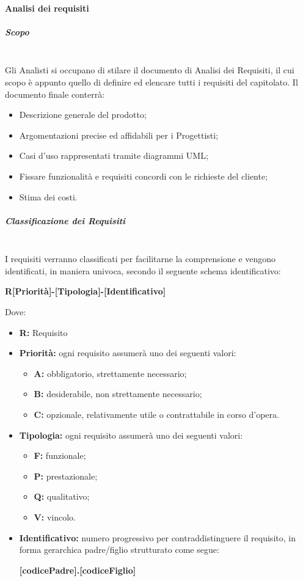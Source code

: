 			\paragraph{Analisi dei requisiti}
				\subparagraph{Scopo \\  \\}
					Gli Analisti si occupano di stilare il documento di Analisi dei Requisiti, il cui scopo è appunto quello di definire ed elencare tutti i requisiti del capitolato. Il documento finale conterrà:
					\begin{itemize}
						\item Descrizione generale del prodotto;
						\item Argomentazioni precise ed affidabili per i Progettisti;
						\item Casi d'uso rappresentati tramite diagrammi UML;
						\item Fissare funzionalità e requisiti concordi con le richieste del cliente;
						\item Stima dei costi.
					\end{itemize}
				\subparagraph{Classificazione dei Requisiti \\ \\}
					I requisiti verranno classificati per facilitarne la comprensione e vengono identificati, in maniera univoca, secondo il seguente schema identificativo:
					\begin{center}
						\textbf{R[Priorità]-[Tipologia]-[Identificativo]}
					\end{center}
					Dove:
					\begin{itemize}
						\item \textbf{R:} Requisito 
						\item \textbf{Priorità:} ogni requisito assumerà uno dei seguenti valori:
						\begin{itemize}
							\item \textbf{A:} obbligatorio, strettamente necessario;
							\item \textbf{B:} desiderabile, non strettamente necessario;
							\item \textbf{C:} opzionale, relativamente utile o contrattabile in corso d'opera.
						\end{itemize}
						\item \textbf{Tipologia:} ogni requisito assumerà uno dei seguenti valori:
						\begin{itemize}
							\item \textbf{F:} funzionale;
							\item \textbf{P:} prestazionale;
							\item \textbf{Q:} qualitativo;
							\item \textbf{V:} vincolo.
						\end{itemize}
						\item \textbf{Identificativo:} numero progressivo per contraddistinguere il requisito, in forma gerarchica padre/figlio strutturato come segue: 
						\begin{center}
							\textbf{[codicePadre].[codiceFiglio]}
						\end{center}
					\end{itemize}
